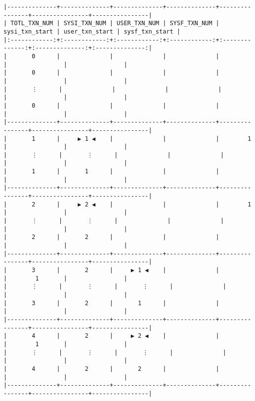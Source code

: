 \documentclass[varwidth=\maxdimen,margin=0.5cm,multi={verbatim}]{standalone}
\begin{document}
\begin{verbatim}
|--------------+--------------+--------------+--------------+----------------+----------------+----------------|
| TOTL_TXN_NUM | SYSI_TXN_NUM | USER_TXN_NUM | SYSF_TXN_NUM | sysi_txn_start | user_txn_start | sysf_txn_start |
|:------------:+:------------:+:------------:+:------------:+:--------------:+:--------------:+:--------------:|
|       0      |              |              |              |                |                |                |
|       0      |              |              |              |                |                |                |
|       ⋮      |              |              |              |                |                |                |
|       0      |              |              |              |                |                |                |
|--------------+--------------+--------------+--------------+----------------+----------------+----------------|
|       1      |     ▶ 1 ◀    |              |              |        1       |                |                |
|       ⋮      |       ⋮      |              |              |                |                |                |
|       1      |       1      |              |              |                |                |                |
|--------------+--------------+--------------+--------------+----------------+----------------+----------------|
|       2      |     ▶ 2 ◀    |              |              |        1       |                |                |
|       ⋮      |       ⋮      |              |              |                |                |                |
|       2      |       2      |              |              |                |                |                |
|--------------+--------------+--------------+--------------+----------------+----------------+----------------|
|       3      |       2      |     ▶ 1 ◀    |              |                |        1       |                |
|       ⋮      |       ⋮      |       ⋮      |              |                |                |                |
|       3      |       2      |       1      |              |                |                |                |
|--------------+--------------+--------------+--------------+----------------+----------------+----------------|
|       4      |       2      |     ▶ 2 ◀    |              |                |        1       |                |
|       ⋮      |       ⋮      |       ⋮      |              |                |                |                |
|       4      |       2      |       2      |              |                |                |                |
|--------------+--------------+--------------+--------------+----------------+----------------+----------------|

\end{verbatim}
\end{document}
